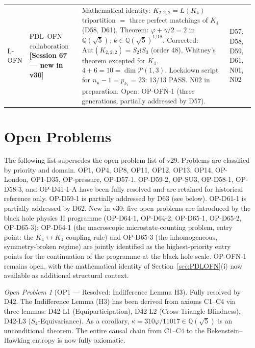 \documentclass[11pt,a4paper]{article}
\theoremstyle{plain}
\theoremstyle{definition}
\theoremstyle{remark}
\newtheorem{openproblem}[theorem]{Open Problem}
\begin{document}
\begin{longtable}{L{0.6cm}L{3.0cm}L{5.5cm}L{4.0cm}}
L-OFN & PDL--OFN collaboration \textbf{[Session 67 --- new in v30]} & \textcolor{proofblue}{Mathematical identity}: $K_{2,2,2}=L(K_4)$ tripartition $=$ three perfect matchings of $K_4$ (D58, D61). \textcolor{proofblue}{Theorem}: $\varphi+\gamma/2=2$ in $\mathbb{Q}(\sqrt{5})$; $k\in\mathbb{Q}(\sqrt{5})^{1/18}$. \textcolor{proofblue}{Corrected}: $\mathrm{Aut}(K_{2,2,2})=S_2\wr S_3$ (order 48), Whitney's theorem excepted for $K_4$. $4+6=10=\dim\mathcal{P}(1,3)$. Lockdown script for $n_u-1=p_{k_1}=23$: 13/13 PASS. N02 in preparation. Open: OP-OFN-1 (three generations, partially addressed by D57). & D57, D58, D59, D61, N01, N02\\[0.3em]
\end{longtable}

\section{Open Problems}
\label{sec:openproblems}

The following list supersedes the open-problem list of v29. Problems are classified by priority and domain. OP1, OP4, OP8, OP11, OP12, OP13, OP14, OP-London, OP1-D35, OP-pressure, OP-D57-1, OP-D59-2, OP-SU3, OP-D58-1, OP-D58-3, and OP-D41-1-A have been fully resolved and are retained for historical reference only. OP-D59-1 is partially addressed by D63 (see below). OP-D61-1 is partially addressed by D62. New in v30: five open problems are introduced by the black hole physics II programme (OP-D64-1, OP-D64-2, OP-D65-1, OP-D65-2, OP-D65-3); OP-D64-1 (the macroscopic microstate-counting problem, entry point: the $K_4\leftrightarrow K_4$ coupling rule) and OP-D65-3 (the inhomogeneous, symmetry-broken regime) are jointly identified as the highest-priority entry points for the continuation of the programme at the black hole scale. OP-OFN-1 remains open, with the mathematical identity of Section~\ref{sec:PDLOFN}(i) now available as additional structural context.

\begin{openproblem}[OP1 --- Resolved: Indifference Lemma H3]
\label{op:H3}
\textcolor{proofblue}{Fully resolved by D42.} The Indifference Lemma (H3) has been derived from axioms C1--C4 via three lemmas: D42-L1 (Equiparticipation), D42-L2 (Cross-Triangle Blindness), D42-L3 ($S_4$-Equivariance). As a corollary, $\kappa=310\varphi/11017\in\mathbb{Q}(\sqrt{5})$ is an unconditional theorem. The entire causal chain from C1--C4 to the Bekenstein--Hawking entropy is now fully axiomatic.
\end{openproblem}
\end{document}
